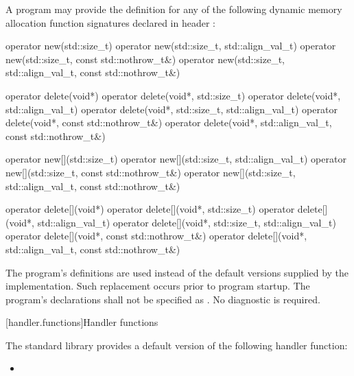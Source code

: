 \pnum
A \Cpp{} program may provide the definition for any of the following
dynamic memory allocation function signatures declared in header
:
%
%
\begin{codeblock}
operator new(std::size_t)
operator new(std::size_t, std::align_val_t)
operator new(std::size_t, const std::nothrow_t&)
operator new(std::size_t, std::align_val_t, const std::nothrow_t&)
\end{codeblock}%
%
%
\begin{codeblock}
operator delete(void*)
operator delete(void*, std::size_t)
operator delete(void*, std::align_val_t)
operator delete(void*, std::size_t, std::align_val_t)
operator delete(void*, const std::nothrow_t&)
operator delete(void*, std::align_val_t, const std::nothrow_t&)
\end{codeblock}%
%
%
\begin{codeblock}
operator new[](std::size_t)
operator new[](std::size_t, std::align_val_t)
operator new[](std::size_t, const std::nothrow_t&)
operator new[](std::size_t, std::align_val_t, const std::nothrow_t&)
\end{codeblock}%
%
%
\begin{codeblock}
operator delete[](void*)
operator delete[](void*, std::size_t)
operator delete[](void*, std::align_val_t)
operator delete[](void*, std::size_t, std::align_val_t)
operator delete[](void*, const std::nothrow_t&)
operator delete[](void*, std::align_val_t, const std::nothrow_t&)
\end{codeblock}

\pnum
The program's definitions are used instead of the default versions supplied by
the implementation.
Such replacement occurs prior to program startup.
%
The program's declarations shall not be specified as
.
No diagnostic is required.

[handler.functions]{Handler functions}

\pnum
The \Cpp{} standard library provides a default version of the following handler
function:
\begin{itemize}
\item
{}
%
\end{itemize}


